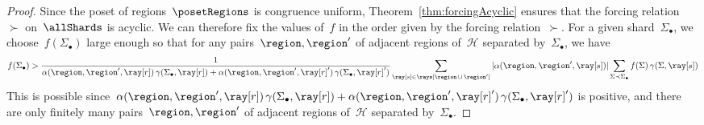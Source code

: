 \documentclass{amsart}
\theoremstyle{definition}
\newcommand{\arrangement}{\mathcal{H}} %
\newcommand{\shard}{\Sigma}
\newcommand{\contribution}{\gamma} %
\newcommand{\coefficient}{\alpha} %
\begin{document}
\begin{proof}
Since the poset of regions~$\posetRegions$ is congruence uniform, Theorem~\ref{thm:forcingAcyclic} ensures that the forcing relation~$\succ$ on~$\allShards$ is acyclic.
We can therefore fix the values of~$f$ in the order given by the forcing relation~$\succ$. For a given shard~$\shard_\bullet$, we choose~$f(\shard_\bullet)$ large enough so that for any pairs~$\region, \region'$ of adjacent regions of~$\arrangement$ separated by~$\shard_\bullet$, we have
\[
f(\shard_\bullet) > \frac{1}{\coefficient(\region, \region', \ray[r]) \, \contribution(\shard_\bullet, \ray[r]) + \coefficient(\region, \region', \ray[r]') \, \contribution(\shard_\bullet, \ray[r]')} \sum_{\ray[s] \in \rays[\region \,\cup\, \region']} |\coefficient(\region, \region', \ray[s])| \sum_{\shard \prec \shard_\bullet} f(\shard) \, \contribution(\shard, \ray[s])
\]
This is possible since~${\coefficient(\region, \region', \ray[r]) \, \contribution(\shard_\bullet, \ray[r]) + \coefficient(\region, \region', \ray[r]') \, \contribution(\shard_\bullet, \ray[r]')}$ is positive, and there are only finitely many pairs~$\region, \region'$ of adjacent regions of~$\arrangement$ separated by~$\shard_\bullet$.
\end{proof}
\end{document}

